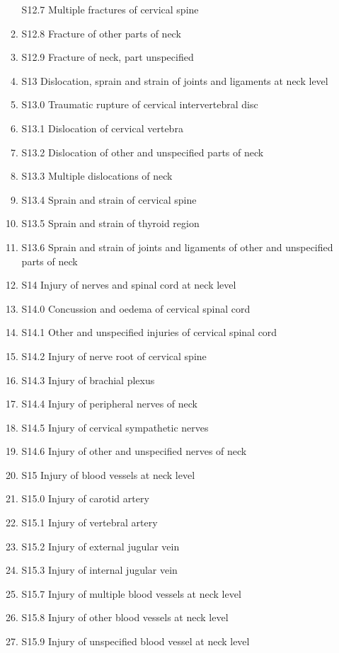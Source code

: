 \documentclass[
]{scrartcl}
\begin{document}
\begin{itemize}
\begin{enumerate}
    S12.7 Multiple fractures of cervical spine
  \item
    S12.8 Fracture of other parts of neck
  \item
    S12.9 Fracture of neck, part unspecified
  \item
    S13 Dislocation, sprain and strain of joints and ligaments at neck
    level
  \item
    S13.0 Traumatic rupture of cervical intervertebral disc
  \item
    S13.1 Dislocation of cervical vertebra
  \item
    S13.2 Dislocation of other and unspecified parts of neck
  \item
    S13.3 Multiple dislocations of neck
  \item
    S13.4 Sprain and strain of cervical spine
  \item
    S13.5 Sprain and strain of thyroid region
  \item
    S13.6 Sprain and strain of joints and ligaments of other and
    unspecified parts of neck
  \item
    S14 Injury of nerves and spinal cord at neck level
  \item
    S14.0 Concussion and oedema of cervical spinal cord
  \item
    S14.1 Other and unspecified injuries of cervical spinal cord
  \item
    S14.2 Injury of nerve root of cervical spine
  \item
    S14.3 Injury of brachial plexus
  \item
    S14.4 Injury of peripheral nerves of neck
  \item
    S14.5 Injury of cervical sympathetic nerves
  \item
    S14.6 Injury of other and unspecified nerves of neck
  \item
    S15 Injury of blood vessels at neck level
  \item
    S15.0 Injury of carotid artery
  \item
    S15.1 Injury of vertebral artery
  \item
    S15.2 Injury of external jugular vein
  \item
    S15.3 Injury of internal jugular vein
  \item
    S15.7 Injury of multiple blood vessels at neck level
  \item
    S15.8 Injury of other blood vessels at neck level
  \item
    S15.9 Injury of unspecified blood vessel at neck level

\end{enumerate}
\end{itemize}
\end{document}
